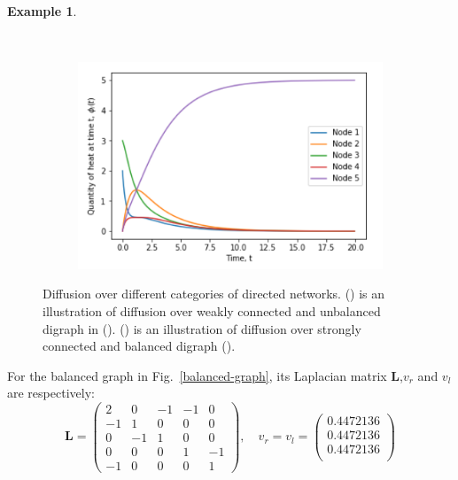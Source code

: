 \documentclass[10pt,a4paper]{article}
\theoremstyle{plain}
\theoremstyle{definition}
\newtheorem{exa}[subsection]{Example}
\begin{document}
\begin{exa}
\begin{figure}[H]
\begin{subfigure}[b]{0.40\textwidth}
            	\caption{}
            	\label{unbalanced-graph}
            \end{subfigure}~
            \begin{subfigure}[b]{0.5\textwidth}
            	\includegraphics[width= \textwidth]{images/non-balnceddigraph-difusion.png}
            	\caption{}
            	\label{plot-unbalanced}
            \end{subfigure}
      		\caption{Diffusion over different categories of directed networks. () is an illustration of diffusion over weakly connected and unbalanced digraph in (). () is an illustration of diffusion over strongly connected and balanced digraph ().  }  
      		\label{unbalanced-diffusion}		
      	\end{figure} 
   For the balanced graph in Fig.~\ref{balanced-graph}, its Laplacian matrix $\mathbf{L}$,$v_r$ and $v_l$ are respectively:
   \begin{equation*}
   \mathbf{L} = \begin{pmatrix}
    2 &  0 & -1 & -1 &  0 \\
   -1 & 1  & 0  & 0  &  0 \\ 
    0 & -1 & 1  & 0  &  0 \\
    0 &  0 & 0  & 1  & -1 \\
    -1&  0 & 0  & 0  & 1
   \end{pmatrix}, \quad 
   v_r = v_l = \begin{pmatrix}
   0.4472136 \\  
   0.4472136 \\  
   0.4472136 \\ 

\end{pmatrix}
\end{equation*}
\end{exa}
\end{document}
